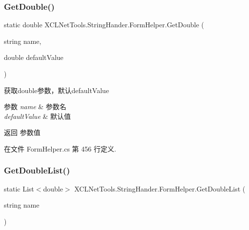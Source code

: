 \subsubsection{\texorpdfstring{Get\+Double()}{GetDouble()}\hspace{0.1cm}{\footnotesize\ttfamily [2/2]}}
{\footnotesize\ttfamily static double X\+C\+L\+Net\+Tools.\+String\+Hander.\+Form\+Helper.\+Get\+Double (\begin{DoxyParamCaption}\item[{string}]{name,  }\item[{double}]{default\+Value }\end{DoxyParamCaption})\hspace{0.3cm}{\ttfamily [static]}}



获取double参数，默认default\+Value 


\begin{DoxyParams}{参数}
{\em name} & 参数名\\
\hline
{\em default\+Value} & 默认值\\
\hline
\end{DoxyParams}
\begin{DoxyReturn}{返回}
参数值
\end{DoxyReturn}


在文件 Form\+Helper.\+cs 第 456 行定义.

\mbox{\label{class_x_c_l_net_tools_1_1_string_hander_1_1_form_helper_a3e7cff936c30c0bdc0c61f2c34ca942d}} 
\subsubsection{\texorpdfstring{Get\+Double\+List()}{GetDoubleList()}}
{\footnotesize\ttfamily static List$<$double$>$ X\+C\+L\+Net\+Tools.\+String\+Hander.\+Form\+Helper.\+Get\+Double\+List (\begin{DoxyParamCaption}\item[{string}]{name }\end{DoxyParamCaption})\hspace{0.3cm}{\ttfamily [static]}}




